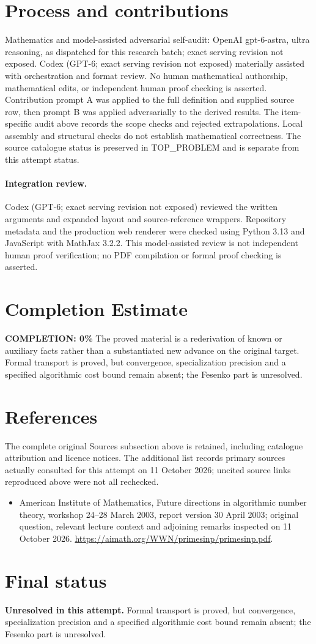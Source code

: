 \documentclass[11pt]{article}
\begin{document}
\section{Process and contributions}
Mathematics and model-assisted adversarial self-audit: OpenAI gpt-6-astra, ultra reasoning, as dispatched for this research batch; exact serving revision not exposed. Codex (GPT-6; exact serving revision not exposed) materially assisted with orchestration and format review. No human mathematical authorship, mathematical edits, or independent human proof checking is asserted.
Contribution prompt A was applied to the full definition and supplied source row, then prompt B was applied adversarially to the derived results. The item-specific audit above records the scope checks and rejected extrapolations. Local assembly and structural checks do not establish mathematical correctness. The source catalogue status is preserved in TOP\_PROBLEM and is separate from this attempt status.
\paragraph{Integration review.} Codex (GPT-6; exact serving revision not exposed) reviewed the written arguments and expanded layout and source-reference wrappers. Repository metadata and the production web renderer were checked using Python 3.13 and JavaScript with MathJax 3.2.2. This model-assisted review is not independent human proof verification; no PDF compilation or formal proof checking is asserted.

\section{Completion Estimate}
\noindent\textbf{COMPLETION: 0\%}
The proved material is a rederivation of known or auxiliary facts rather than a substantiated new advance on the original target. Formal transport is proved, but convergence, specialization precision and a specified algorithmic cost bound remain absent; the Fesenko part is unresolved.
\section{References}
The complete original Sources subsection above is retained, including catalogue attribution and licence notices. The additional list records primary sources actually consulted for this attempt on 11 October 2026; uncited source links reproduced above were not all rechecked.
\begin{itemize}
\item American Institute of Mathematics, Future directions in algorithmic number theory, workshop 24--28 March 2003, report version 30 April 2003; original question, relevant lecture context and adjoining remarks inspected on 11 October 2026. \url{https://aimath.org/WWN/primesinp/primesinp.pdf}.
\end{itemize}
\section{Final status}
\textbf{Unresolved in this attempt.} Formal transport is proved, but convergence, specialization precision and a specified algorithmic cost bound remain absent; the Fesenko part is unresolved.
\end{document}
